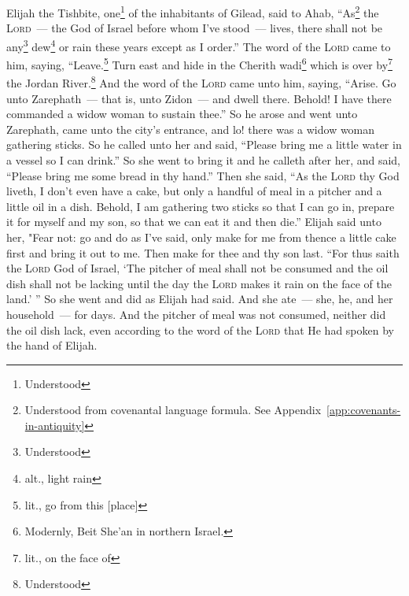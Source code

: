 
\begin{inparaenum}
     Elijah the Tishbite, one\footnote{Understood} of the inhabitants of Gilead, said to Ahab, ``As\footnote{Understood from covenantal language formula. See Appendix~\ref{app:covenants-in-antiquity}} the \textsc{Lord}~--- the God of Israel before whom I've stood~--- lives, there shall not be any\footnote{Understood} dew\footnote{alt., light rain} or rain these years except as I order.''%
     The word of the \textsc{Lord} came to him, saying,%
     ``Leave.\footnote{lit., go from this [place]} Turn east and hide in the Cherith wadi\footnote{Modernly, Beit She'an in northern Israel.} which is over by\footnote{lit., on the face of} the Jordan River.\footnote{Understood}%
     And the word of the \textsc{Lord} came unto him, saying,%
     ``Arise. Go unto Zarephath~--- that is, unto Zidon~--- and dwell there. Behold! I have there commanded a widow woman to sustain thee.''%
     So he arose and went unto Zarephath, came unto the city's entrance, and lo! there was a widow woman gathering sticks. So he called unto her and said, ``Please bring me a little water in a vessel so I can drink.''%
     So she went to bring it and he calleth after her, and said, ``Please bring me some bread in thy hand.''%
     Then she said, ``As the \textsc{Lord} thy God liveth, I don't even have a cake, but only a handful of meal in a pitcher and a little oil in a dish. Behold, I am gathering two sticks so that I can go in, prepare it for myself and my son, so that we can eat it and then die.''%
     Elijah said unto her, "Fear not: go and do as I've said, only make for me from thence a little cake first and bring it out to me. Then make for thee and thy son last.%
     ``For thus saith the \textsc{Lord} God of Israel, `The pitcher of meal shall not be consumed and the oil dish shall not be lacking until the day the \textsc{Lord} makes it rain on the face of the land.' ''%
     So she went and did as Elijah had said. And she ate~--- she, he, and her household~--- for days.%
     And the pitcher of meal was not consumed, neither did the oil dish lack, even according to the word of the \textsc{Lord} that He had spoken by the hand of Elijah.%

\end{inparaenum}
